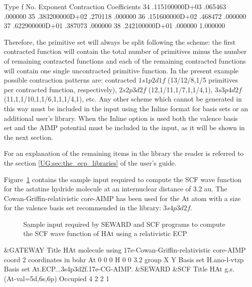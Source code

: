 \begin{sourcelisting}
                  Type
                   f
           No.      Exponent    Contraction Coefficients
           34   .115100000D+03   .065463   .000000
           35   .383200000D+02   .270118   .000000
           36   .151600000D+02   .468472   .000000
           37   .622900000D+01   .387073   .000000
           38   .242100000D+01   .000000  1.000000
\end{sourcelisting}

Therefore, the primitive set will always be split following the scheme:
the first contracted function will contain the total number of primitives 
minus the number of remaining contracted functions and each of the
remaining contracted functions will contain one single uncontracted 
primitive function. In the present example possible contraction patterns
are: contracted $1s1p2d1f$ (13/12/8,1/5 primitives per contracted function, respectively), 
$2s2p3d2f$ (12,1/11,1/7,1,1/4,1), $3s3p4d2f$ (11,1,1/10,1,1/6,1,1,1/4,1), etc.
Any other scheme which cannot be generated in this way must be included in
the input using the Inline format for basis sets or an additional user's library. 
When the Inline option is
used both the valence basis set and the AIMP potential must be included in
the input, as it will be shown in the next section. 

For an explanation of the remaining items in the library the reader is referred
to the section \ref{UG:sec:the_ecp_libraries} of the user's guide.

Figure~\ref{fig:hat_scf} contains the sample input required to compute the
SCF wave function for the astatine hydride molecule at an internuclear
distance of 3.2 au. 
The Cowan-Griffin-relativistic core-AIMP has been
used for the At atom with a size for the valence basis set recommended in the
 library: $3s4p3d2f$. 

\begin{figure}[h]
\caption{Sample input required by SEWARD and SCF programs to compute the SCF 
wave function of HAt using a relativistic ECP}
\label{fig:hat_scf}
\end{figure}

\begin{inputlisting}
 &GATEWAY
Title
HAt molecule using 17e-Cowan-Griffin-relativistic core-AIMP
coord
2
coordinates in bohr
At 0 0 0
H  0 0 3.2
group
X Y
Basis set
H.ano-l-vtzp
Basis set
At.ECP...3s4p3d2f.17e-CG-AIMP. 
 &SEWARD
 &SCF
Title
 HAt g.s. (At-val=5d,6s,6p)
Occupied
 4 2 2 1
\end{inputlisting}

